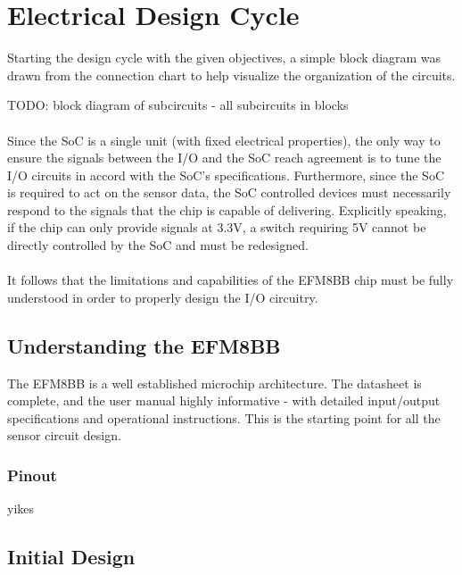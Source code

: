 \documentclass[12pt]{article}
\begin{document}
	\section{Electrical Design Cycle\label{sec:devel-electr-design}} 

  Starting the design cycle with the given objectives, a simple block diagram was drawn from the connection chart to help visualize the organization of the circuits.

  TODO: block diagram of subcircuits - all subcircuits in blocks

  \paragraph{}
  Since the SoC is a single unit (with fixed electrical properties), the only way to ensure the signals between the I/O and the SoC reach agreement is to tune the I/O circuits in accord with the SoC's specifications. Furthermore, since the SoC is required to act on the sensor data, the SoC controlled devices must necessarily respond to the signals that the chip is capable of delivering. Explicitly speaking, if the chip can only provide signals at 3.3V, a switch requiring 5V cannot be directly controlled by the SoC and must be redesigned.
  
  \paragraph{}
  It follows that the limitations and capabilities of the EFM8BB chip must be fully understood in order to properly design the I/O circuitry.
  
  \subsection{Understanding the EFM8BB\label{sec:understanding-soc}}

  The EFM8BB is a well established microchip architecture. The datasheet is complete, and the user manual highly informative - with detailed input/output specifications and operational instructions. This is the starting point for all the sensor circuit design.

  \subsubsection{Pinout}
  yikes

  \subsection{Initial Design}
\end{document}
